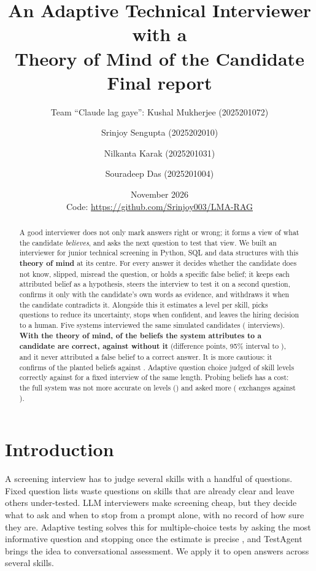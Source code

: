 \documentclass[10pt,a4paper]{article}
\title{An Adaptive Technical Interviewer with a\\Theory of Mind of the Candidate\\[4pt]\large Final report}
\author{Team ``Claude lag gaye'': Kushal Mukherjee (2025201072) \and Srinjoy Sengupta (2025202010)
  \and Nilkanta Karak (2025201031) \and Souradeep Das (2025201004)}
\date{November 2026\\[4pt]\small Code: \url{https://github.com/Srinjoy003/LMA-RAG}}
\begin{document}
\maketitle

\begin{abstract}
A good interviewer does not only mark answers right or wrong; it forms a view of what the candidate
\emph{believes}, and asks the next question to test that view. We built an interviewer for junior
technical screening in Python, SQL and data structures with this \textbf{theory of mind} at its
centre. For every answer it decides whether the candidate does not know, slipped, misread the
question, or holds a specific false belief; it keeps each attributed belief as a hypothesis, steers
the interview to test it on a second question, confirms it only with the candidate's own words as
evidence, and withdraws it when the candidate contradicts it. Alongside this it estimates a level per
skill, picks questions to reduce its uncertainty, stops when confident, and leaves the hiring decision
to a human. Five systems interviewed the same \fN{} simulated candidates (\fInterviews{} interviews).
\textbf{With the theory of mind, \fPrecisionFull{} of the beliefs the system attributes to a candidate
are correct, against \fPrecisionAfour{} without it} (difference \fFullVsAfourPrecisionDiff{} points,
95\% interval \fFullVsAfourPrecisionLow{} to \fFullVsAfourPrecisionHigh{}), and it never attributed a
false belief to a correct answer. It is more cautious: it confirms \fRecallFull{} of the planted
beliefs against \fRecallAfour{}. Adaptive question choice judged \fAccAdapt{} of skill levels correctly
against \fAccBOne{} for a fixed interview of the same length. Probing beliefs has a cost: the full
system was not more accurate on levels (\fAccFull{}) and asked more (\fExchFull{} exchanges against
\fExchBOne{}).
\end{abstract}

\section{Introduction}

A screening interview has to judge several skills with a handful of questions. Fixed question lists
waste questions on skills that are already clear and leave others under-tested. LLM interviewers
make screening cheap, but they decide what to ask and when to stop from a prompt alone, with no
record of how sure they are. Adaptive testing solves this for multiple-choice tests by asking the
most informative question and stopping once the estimate is precise \cite{zhuang2024}, and
TestAgent \cite{yu2025} brings the idea to conversational assessment. We apply it to open answers
across several skills.
\end{document}
